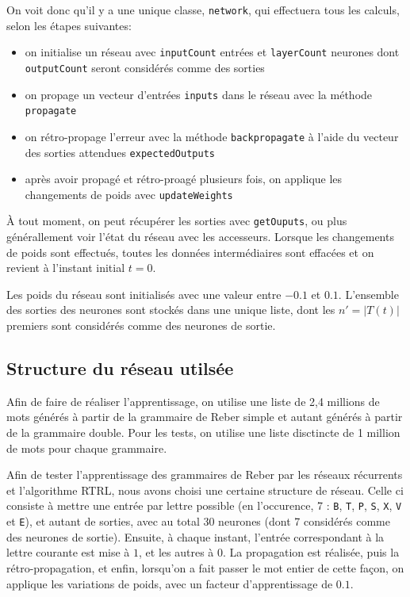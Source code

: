 On voit donc qu'il y a une unique classe, \verb+network+, qui effectuera tous les calculs, selon les étapes suivantes:
\begin{itemize}
	\item on initialise un réseau avec \verb+inputCount+ entrées et \verb+layerCount+ neurones dont \verb+outputCount+ seront considérés comme des sorties
	\item on propage un vecteur d'entrées \verb+inputs+ dans le réseau avec la méthode \verb+propagate+
	\item on rétro-propage l'erreur avec la méthode \verb+backpropagate+ à l'aide du vecteur des sorties attendues \verb+expectedOutputs+
	\item après avoir propagé et rétro-proagé plusieurs fois, on applique les changements de poids avec \verb+updateWeights+
\end{itemize}
À tout moment, on peut récupérer les sorties avec \verb+getOuputs+, ou plus générallement voir l'état du réseau avec les accesseurs. Lorsque les changements de poids sont effectués, toutes les données intermédiaires sont effacées et on revient à l'instant initial $t=0$.

Les poids du réseau sont initialisés avec une valeur entre $-0.1$ et $0.1$. L'ensemble des sorties des neurones sont stockés dans une unique liste, dont les $n'=|T(t)|$ premiers sont considérés comme des neurones de sortie.

\subsection{Structure du réseau utilsée}
Afin de faire de réaliser l'apprentissage, on utilise une liste de 2,4 millions de mots générés à partir de la grammaire de Reber simple et autant générés à partir de la grammaire double. Pour les tests, on utilise une liste disctincte de 1 million de mots pour chaque grammaire.

Afin de tester l'apprentissage des grammaires de Reber par les réseaux récurrents et l'algorithme RTRL, nous avons choisi une certaine structure de réseau. Celle ci consiste à mettre une entrée par lettre possible (en l'occurence, 7 : \verb+B+, \verb+T+, \verb+P+, \verb+S+, \verb+X+, \verb+V+ et \verb+E+), et autant de sorties, avec au total 30 neurones (dont 7 considérés comme des neurones de sortie). Ensuite, à chaque instant, l'entrée correspondant à la lettre courante est mise à $1$, et les autres à $0$. La propagation est réalisée, puis la rétro-propagation, et enfin, lorsqu'on a fait passer le mot entier de cette façon, on applique les variations de poids, avec un facteur d'apprentissage de $0.1$.

